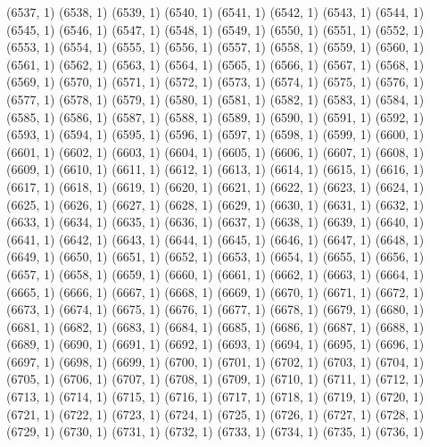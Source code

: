 {   (6537, 1)
   (6538, 1)
   (6539, 1)
   (6540, 1)
   (6541, 1)
   (6542, 1)
   (6543, 1)
   (6544, 1)
   (6545, 1)
   (6546, 1)
   (6547, 1)
   (6548, 1)
   (6549, 1)
   (6550, 1)
   (6551, 1)
   (6552, 1)
   (6553, 1)
   (6554, 1)
   (6555, 1)
   (6556, 1)
   (6557, 1)
   (6558, 1)
   (6559, 1)
   (6560, 1)
   (6561, 1)
   (6562, 1)
   (6563, 1)
   (6564, 1)
   (6565, 1)
   (6566, 1)
   (6567, 1)
   (6568, 1)
   (6569, 1)
   (6570, 1)
   (6571, 1)
   (6572, 1)
   (6573, 1)
   (6574, 1)
   (6575, 1)
   (6576, 1)
   (6577, 1)
   (6578, 1)
   (6579, 1)
   (6580, 1)
   (6581, 1)
   (6582, 1)
   (6583, 1)
   (6584, 1)
   (6585, 1)
   (6586, 1)
   (6587, 1)
   (6588, 1)
   (6589, 1)
   (6590, 1)
   (6591, 1)
   (6592, 1)
   (6593, 1)
   (6594, 1)
   (6595, 1)
   (6596, 1)
   (6597, 1)
   (6598, 1)
   (6599, 1)
   (6600, 1)
   (6601, 1)
   (6602, 1)
   (6603, 1)
   (6604, 1)
   (6605, 1)
   (6606, 1)
   (6607, 1)
   (6608, 1)
   (6609, 1)
   (6610, 1)
   (6611, 1)
   (6612, 1)
   (6613, 1)
   (6614, 1)
   (6615, 1)
   (6616, 1)
   (6617, 1)
   (6618, 1)
   (6619, 1)
   (6620, 1)
   (6621, 1)
   (6622, 1)
   (6623, 1)
   (6624, 1)
   (6625, 1)
   (6626, 1)
   (6627, 1)
   (6628, 1)
   (6629, 1)
   (6630, 1)
   (6631, 1)
   (6632, 1)
   (6633, 1)
   (6634, 1)
   (6635, 1)
   (6636, 1)
   (6637, 1)
   (6638, 1)
   (6639, 1)
   (6640, 1)
   (6641, 1)
   (6642, 1)
   (6643, 1)
   (6644, 1)
   (6645, 1)
   (6646, 1)
   (6647, 1)
   (6648, 1)
   (6649, 1)
   (6650, 1)
   (6651, 1)
   (6652, 1)
   (6653, 1)
   (6654, 1)
   (6655, 1)
   (6656, 1)
   (6657, 1)
   (6658, 1)
   (6659, 1)
   (6660, 1)
   (6661, 1)
   (6662, 1)
   (6663, 1)
   (6664, 1)
   (6665, 1)
   (6666, 1)
   (6667, 1)
   (6668, 1)
   (6669, 1)
   (6670, 1)
   (6671, 1)
   (6672, 1)
   (6673, 1)
   (6674, 1)
   (6675, 1)
   (6676, 1)
   (6677, 1)
   (6678, 1)
   (6679, 1)
   (6680, 1)
   (6681, 1)
   (6682, 1)
   (6683, 1)
   (6684, 1)
   (6685, 1)
   (6686, 1)
   (6687, 1)
   (6688, 1)
   (6689, 1)
   (6690, 1)
   (6691, 1)
   (6692, 1)
   (6693, 1)
   (6694, 1)
   (6695, 1)
   (6696, 1)
   (6697, 1)
   (6698, 1)
   (6699, 1)
   (6700, 1)
   (6701, 1)
   (6702, 1)
   (6703, 1)
   (6704, 1)
   (6705, 1)
   (6706, 1)
   (6707, 1)
   (6708, 1)
   (6709, 1)
   (6710, 1)
   (6711, 1)
   (6712, 1)
   (6713, 1)
   (6714, 1)
   (6715, 1)
   (6716, 1)
   (6717, 1)
   (6718, 1)
   (6719, 1)
   (6720, 1)
   (6721, 1)
   (6722, 1)
   (6723, 1)
   (6724, 1)
   (6725, 1)
   (6726, 1)
   (6727, 1)
   (6728, 1)
   (6729, 1)
   (6730, 1)
   (6731, 1)
   (6732, 1)
   (6733, 1)
   (6734, 1)
   (6735, 1)
   (6736, 1)
}

